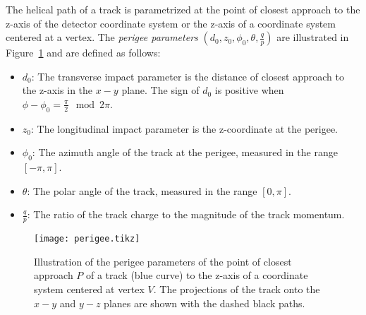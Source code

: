 \documentclass[11pt]{article}
\begin{document}
The helical path of a track is parametrized at the point of closest approach
to the z-axis of the detector coordinate system or the z-axis of a coordinate
system centered at a vertex. The \emph{perigee parameters}
$(d_0, z_0, \phi_0, \theta, \frac{q}{p})$ are illustrated in
Figure~\ref{fig:perigee} and are defined as follows:

\begin{itemize}
\item $d_0$: The transverse impact parameter is the distance of closest
    approach to the z-axis in the $x-y$ plane. The sign of $d_0$ is
    positive when $\phi - \phi_0 = \frac{\pi}{2} \mod 2\pi$.
\item $z_0$: The longitudinal impact parameter is the z-coordinate at the
    perigee.
\item $\phi_0$: The azimuth angle of the track at the perigee, measured in
    the range $[-\pi, \pi]$.
\item $\theta$: The polar angle of the track, measured in the
    range $[0, \pi]$.
\item $\frac{q}{p}$: The ratio of the track charge to the magnitude of the
    track momentum.
\end{itemize}

\begin{figure}[h]
\centering
\texttt{[image: perigee.tikz]}
\caption{
Illustration of the perigee parameters of the point of closest approach $P$ of
a track (blue curve) to the z-axis of a coordinate system centered at vertex $V$.
The projections of the track onto the $x-y$ and $y-z$ planes are shown
with the dashed black paths.}
\label{fig:perigee}
\end{figure}
\end{document}
